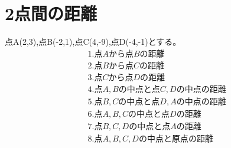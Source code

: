 \documentclass[paper=b4j,landscape,twocolumn,fleqn]{jlreq}
\begin{document}
\section{2点間の距離}
点A(2,3),点B(-2,1),点C(4,-9),点D(-4,-1)とする。
\begin{align*}
　&1.　点Aから点Bの距離\\[1em]
　&2.　点Bから点Cの距離\\[1em]
　&3.　点Cから点Dの距離\\[1em]
　&4.　点A,Bの中点と点C,Dの中点の距離\\[1em]
　&5.　点B,Cの中点と点D,Aの中点の距離\\[1em]
　&6.　点A,B,Cの中点と点Dの距離\\[1em]
　&7.　点B,C,Dの中点と点Aの距離\\[1em]
　&8.　点A,B,C,Dの中点と原点の距離\\[1em]
\end{align*}
\end{document}
